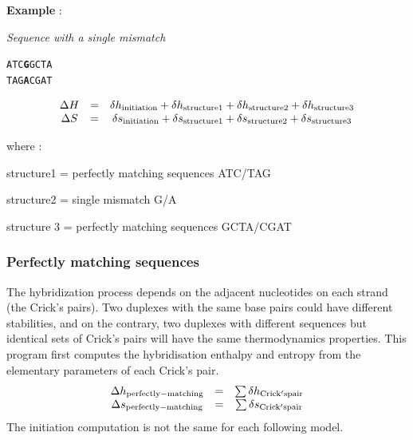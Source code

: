\documentclass{article}
\begin{document}
\textbf{Example} : 

\textit{Sequence with a single mismatch} 
\begin{alltt}
ATC\textbf{G}GCTA
TAG\textbf{A}CGAT
\end{alltt}
\begin{displaymath}
  \begin{array}[t]{ccc}
  \Delta{}H&=&\delta{}h_\mathrm{initiation}+\delta{}h_\mathrm{structure1}+\delta{}h_\mathrm{structure2}+\delta{}h_\mathrm{structure3}\\
  \Delta{}S&=&\delta{}s_\mathrm{initiation}+\delta{}s_\mathrm{structure1}+\delta{}s_\mathrm{structure2}+\delta{}s_\mathrm{structure3}
  \end{array}
\end{displaymath}

where :

structure1 = perfectly matching sequences ATC/TAG

structure2 = single mismatch G/A

structure 3 = perfectly matching sequences GCTA/CGAT

\subsubsection{Perfectly matching sequences}

The hybridization process depends on the adjacent nucleotides on each strand (the Crick's pairs).  
Two duplexes with the same base pairs could have different stabilities, and on the contrary, two 
duplexes with different sequences but identical sets of Crick's pairs will have the same
thermodynamics properties.  This program first computes the hybridisation enthalpy 
and entropy from the elementary parameters of each Crick's pair.
\begin{displaymath}
  \begin{array}[t]{ccc}
  \Delta{}h_\mathrm{perfectly-matching}&=&\sum \delta{}h_\mathrm{Crick's pair}\\
  \Delta{}s_\mathrm{perfectly-matching}&=&\sum \delta{}s_\mathrm{Crick's pair}
  \end{array}
\end{displaymath}
The initiation computation is not the same for each following model. 
\end{document}

